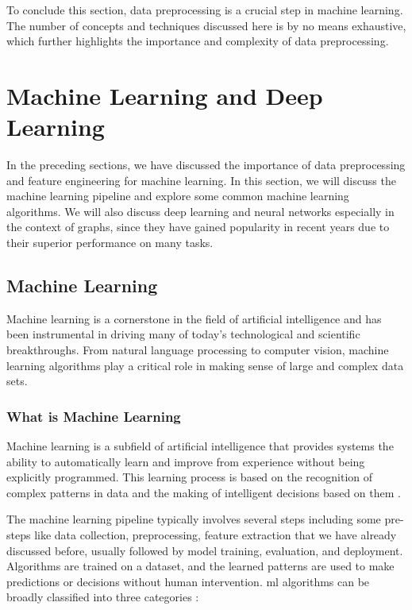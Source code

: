     To conclude this section, data preprocessing is a crucial step in machine learning. The number of concepts and techniques discussed here is by no means exhaustive, which further highlights the importance and complexity of data preprocessing. 

\section{Machine Learning and Deep Learning}\label{sec:background:ml}
    In the preceding sections, we have discussed the importance of data preprocessing and feature engineering for machine learning. In this section, we will discuss the machine learning pipeline and explore some common machine learning algorithms. We will also discuss deep learning and neural networks especially in the context of graphs, since they have gained popularity in recent years due to their superior performance on many tasks.

    \subsection{Machine Learning}
    Machine learning is a cornerstone in the field of artificial intelligence and has been instrumental in driving many of today's technological and scientific breakthroughs. From natural language processing to computer vision, machine learning algorithms play a critical role in making sense of large and complex data sets.

        \subsubsection{What is Machine Learning}
        Machine learning is a subfield of artificial intelligence that provides systems the ability to automatically learn and improve from experience without being explicitly programmed. This learning process is based on the recognition of complex patterns in data and the making of intelligent decisions based on them \cite{ScienceMachineLearning15}.

        The machine learning pipeline typically involves several steps including some pre-steps like data collection, preprocessing, feature extraction that we have already discussed before, usually followed by model training, evaluation, and deployment. Algorithms are trained on a dataset, and the learned patterns are used to make predictions or decisions without human intervention. \acrshort{ml} algorithms can be broadly classified into three categories \cite{ScienceMachineLearning15}:

